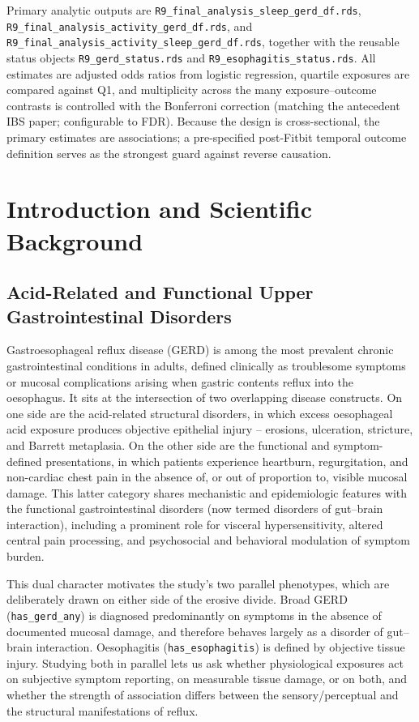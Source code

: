 \documentclass[11pt]{article}
\newcommand{\code}[1]{\texttt{\small #1}}
\begin{document}
Primary analytic outputs are \code{R9_final_analysis_sleep_gerd_df.rds}, \code{R9_final_analysis_activity_gerd_df.rds}, and \code{R9_final_analysis_activity_sleep_gerd_df.rds}, together with the reusable status objects \code{R9_gerd_status.rds} and \code{R9_esophagitis_status.rds}. All estimates are adjusted odds ratios from logistic regression, quartile exposures are compared against Q1, and multiplicity across the many exposure--outcome contrasts is controlled with the Bonferroni correction (matching the antecedent IBS paper; configurable to FDR). Because the design is cross-sectional, the primary estimates are associations; a pre-specified post-Fitbit temporal outcome definition serves as the strongest guard against reverse causation.

\section{Introduction and Scientific Background}

\subsection{Acid-Related and Functional Upper Gastrointestinal Disorders}

Gastroesophageal reflux disease (GERD) is among the most prevalent chronic gastrointestinal conditions in adults, defined clinically as troublesome symptoms or mucosal complications arising when gastric contents reflux into the oesophagus. It sits at the intersection of two overlapping disease constructs. On one side are the acid-related structural disorders, in which excess oesophageal acid exposure produces objective epithelial injury -- erosions, ulceration, stricture, and Barrett metaplasia. On the other side are the functional and symptom-defined presentations, in which patients experience heartburn, regurgitation, and non-cardiac chest pain in the absence of, or out of proportion to, visible mucosal damage. This latter category shares mechanistic and epidemiologic features with the functional gastrointestinal disorders (now termed disorders of gut--brain interaction), including a prominent role for visceral hypersensitivity, altered central pain processing, and psychosocial and behavioral modulation of symptom burden.

This dual character motivates the study's two parallel phenotypes, which are deliberately drawn on
either side of the erosive divide. Broad GERD (\code{has_gerd_any}) is diagnosed
predominantly on symptoms in the absence of documented mucosal damage, and therefore behaves largely as
a disorder of gut--brain interaction. Oesophagitis (\code{has_esophagitis}) is defined by objective
tissue injury. Studying both in parallel lets us ask whether physiological exposures act on subjective symptom reporting, on measurable tissue damage, or on both, and whether the strength of association differs between the sensory/perceptual and the structural manifestations of reflux.
\end{document}
